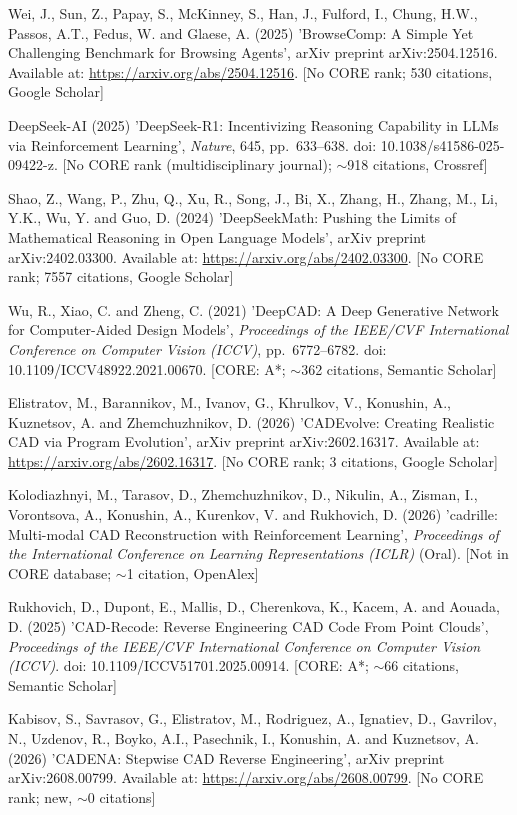 \documentclass[10pt]{article}
\begin{document}
\begin{list}{}{\setlength{\leftmargin}{2em}\setlength{\itemindent}{-2em}}
\item Wei, J., Sun, Z., Papay, S., McKinney, S., Han, J., Fulford, I., Chung, H.W., Passos, A.T., Fedus, W. and Glaese, A. (2025) 'BrowseComp: A Simple Yet Challenging Benchmark for Browsing Agents', arXiv preprint arXiv:2504.12516. Available at: \url{https://arxiv.org/abs/2504.12516}. [No CORE rank; 530 citations, Google Scholar]
\item DeepSeek-AI (2025) 'DeepSeek-R1: Incentivizing Reasoning Capability in LLMs via Reinforcement Learning', \textit{Nature}, 645, pp.\ 633--638. doi: 10.1038/s41586-025-09422-z. [No CORE rank (multidisciplinary journal); $\sim$918 citations, Crossref]
\item Shao, Z., Wang, P., Zhu, Q., Xu, R., Song, J., Bi, X., Zhang, H., Zhang, M., Li, Y.K., Wu, Y. and Guo, D. (2024) 'DeepSeekMath: Pushing the Limits of Mathematical Reasoning in Open Language Models', arXiv preprint arXiv:2402.03300. Available at: \url{https://arxiv.org/abs/2402.03300}. [No CORE rank; 7557 citations, Google Scholar]
\item Wu, R., Xiao, C. and Zheng, C. (2021) 'DeepCAD: A Deep Generative Network for Computer-Aided Design Models', \textit{Proceedings of the IEEE/CVF International Conference on Computer Vision (ICCV)}, pp.\ 6772--6782. doi: 10.1109/ICCV48922.2021.00670. [CORE: A*; $\sim$362 citations, Semantic Scholar]
\item Elistratov, M., Barannikov, M., Ivanov, G., Khrulkov, V., Konushin, A., Kuznetsov, A. and Zhemchuzhnikov, D. (2026) 'CADEvolve: Creating Realistic CAD via Program Evolution', arXiv preprint arXiv:2602.16317. Available at: \url{https://arxiv.org/abs/2602.16317}. [No CORE rank; 3 citations, Google Scholar] %
\item Kolodiazhnyi, M., Tarasov, D., Zhemchuzhnikov, D., Nikulin, A., Zisman, I., Vorontsova, A., Konushin, A., Kurenkov, V. and Rukhovich, D. (2026) 'cadrille: Multi-modal CAD Reconstruction with Reinforcement Learning', \textit{Proceedings of the International Conference on Learning Representations (ICLR)} (Oral). [Not in CORE database; $\sim$1 citation, OpenAlex]
\item Rukhovich, D., Dupont, E., Mallis, D., Cherenkova, K., Kacem, A. and Aouada, D. (2025) 'CAD-Recode: Reverse Engineering CAD Code From Point Clouds', \textit{Proceedings of the IEEE/CVF International Conference on Computer Vision (ICCV)}. doi: 10.1109/ICCV51701.2025.00914. [CORE: A*; $\sim$66 citations, Semantic Scholar]
\item Kabisov, S., Savrasov, G., Elistratov, M., Rodriguez, A., Ignatiev, D., Gavrilov, N., Uzdenov, R., Boyko, A.I., Pasechnik, I., Konushin, A. and Kuznetsov, A. (2026) 'CADENA: Stepwise CAD Reverse Engineering', arXiv preprint arXiv:2608.00799. Available at: \url{https://arxiv.org/abs/2608.00799}. [No CORE rank; new, $\sim$0 citations]

\end{list}
\end{document}

